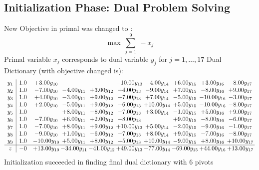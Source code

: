 \documentclass[9pt]{article}
\begin{document}
\subsection{Initialization Phase: Dual Problem Solving}
New Objective in primal was changed to : \[ \max\ \sum_{j=1}^{9}\ - x_j \] 
Primal variable $x_j$ corresponds to dual variable $y_j$ for $j = 1,\ldots,17$
Dual Dictionary (with objective changed is): 
\[\begin{array}{c| c c@{\hskip 2pt} c@{\hskip 2pt} c@{\hskip 2pt} c@{\hskip 2pt} c@{\hskip 2pt} c@{\hskip 2pt} c@{\hskip 2pt} c@{\hskip 2pt} }
 y_{1}   &  1.0 & +  3.00 y_{10} &    &   & -10.00 y_{13} & -4.00 y_{14} & +  6.00 y_{15} & +  3.00 y_{16} & -8.00 y_{17}\\
 y_{2}   &  1.0 & -7.00 y_{10} & -4.00 y_{11} & +  3.00 y_{12} & +  4.00 y_{13} & -9.00 y_{14} & +  7.00 y_{15} & -8.00 y_{16} & +  9.00 y_{17}\\
 y_{3}   &  1.0 & +  4.00 y_{10} & -3.00 y_{11} & +  9.00 y_{12} & +  7.00 y_{13} & +  7.00 y_{14} & -5.00 y_{15} & -10.00 y_{16} & -3.00 y_{17}\\
 y_{4}   &  1.0 & +  2.00 y_{10} & -5.00 y_{11} & +  9.00 y_{12} & -6.00 y_{13} & + 10.00 y_{14} & +  5.00 y_{15} & -10.00 y_{16} & -8.00 y_{17}\\
 y_{5}   &  1.0  &   & +  8.00 y_{11} & -8.00 y_{12} & -7.00 y_{13} & +  3.00 y_{14} & -1.00 y_{15} & +  5.00 y_{16} & +  9.00 y_{17}\\
 y_{6}   &  1.0 & -7.00 y_{10} & +  6.00 y_{11} & +  2.00 y_{12} & -8.00 y_{13} &   & +  9.00 y_{15} & -8.00 y_{16} & -6.00 y_{17}\\
 y_{7}   &  1.0 & -7.00 y_{10} & +  8.00 y_{11} & +  9.00 y_{12} & + 10.00 y_{13} & +  5.00 y_{14} & -2.00 y_{15} & -9.00 y_{16} & -1.00 y_{17}\\
 y_{8}   &  1.0 & -9.00 y_{10} & +  1.00 y_{11} & -6.00 y_{12} & -7.00 y_{13} & +  8.00 y_{14} & +  9.00 y_{15} & -7.00 y_{16} & -8.00 y_{17}\\
 y_{9}   &  1.0 & -10.00 y_{10} & +  5.00 y_{11} & +  8.00 y_{12} & +  5.00 y_{13} & + 10.00 y_{14} & -9.00 y_{15} & +  8.00 y_{16} & + 10.00 y_{17}\\
\hline
z    &  -0 & + 13.00 y_{10} & -34.00 y_{11} & -41.00 y_{12} & + 49.00 y_{13} & -77.00 y_{14} & -69.00 y_{15} & + 44.00 y_{16} & + 13.00 y_{17}\\
\end{array}\]
Initialization succeeded in finding final dual dictionary with 6 pivots
\end{document}
